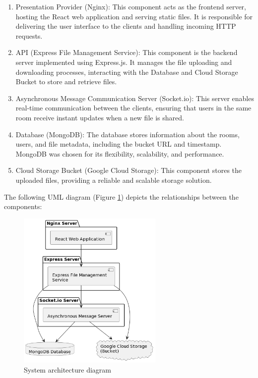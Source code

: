 \documentclass[a4paper,fleqn]{cas-dc}
\begin{document}
\begin{enumerate}
    \item Presentation Provider (Nginx): This component acts as the frontend server, hosting the React web application and serving static files. It is responsible for delivering the user interface to the clients and handling incoming HTTP requests.
    \item API (Express File Management Service): This component is the backend server implemented using Express.js. It manages the file uploading and downloading processes, interacting with the Database and Cloud Storage Bucket to store and retrieve files.
    \item Asynchronous Message Communication Server (Socket.io): This server enables real-time communication between the clients, ensuring that users in the same room receive instant updates when a new file is shared.
    \item Database (MongoDB): The database stores information about the rooms, users, and file metadata, including the bucket URL and timestamp. MongoDB was chosen for its flexibility, scalability, and performance.
    \item Cloud Storage Bucket (Google Cloud Storage): This component stores the uploaded files, providing a reliable and scalable storage solution.
\end{enumerate}

The following UML diagram (Figure \ref{fig:architecture}) depicts the relationships between the components:

\begin{figure}[h]
    \centering
    \includegraphics[width=7cm]{architecture.png}
    \caption{System architecture diagram}
    \label{fig:architecture}
\end{figure}
\end{document}
